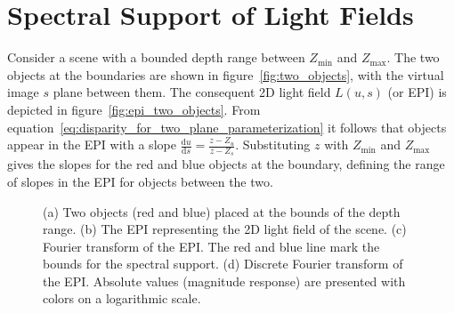 \section{Spectral Support of Light Fields}
\label{sec:Spectral_Support_for_Light_Field}

Consider a scene with a bounded depth range between $Z_{\text{min}}$ and $Z_{\text{max}}$.
The two objects at the boundaries are shown in figure~\ref{fig:two_objects}, with the virtual image $s$ plane between them.
The consequent 2D light field $L(u, s)$ (or EPI) is depicted in figure~\ref{fig:epi_two_objects}.
From equation~\ref{eq:disparity_for_two_plane_parameterization} it follows that objects appear in the EPI with a slope $\frac{\textrm{d}u}{\textrm{d}s} = \frac{z - Z_u}{z - Z_s}$.
Substituting $z$ with $Z_\text{min}$ and $Z_\text{max}$ gives the slopes for the red and blue objects at the boundary, defining the range of slopes in the EPI for objects between the two.

\begin{figure}[tb]
	\begin{subfigure}{0.5\textwidth}
		\centering
		
		\caption{}
		\label{fig:two_objects}
		\vspace{0.5cm}
		
		\caption{}
		\label{fig:epi_fourier_transform_1}
	\end{subfigure}
	\begin{subfigure}{0.5\textwidth}
		\centering
		
		\caption{}
		\label{fig:epi_two_objects}
		\vspace{0.5cm}
		
		\caption{}
		\label{fig:epi_fourier_transform_2}
	\end{subfigure}
	\caption[Spectral analysis for light fields with bounded depth range]
			{(a) Two objects (red and blue) placed at the bounds of the depth range. 
			 (b) The EPI representing the 2D light field of the scene.
			 (c) Fourier transform of the EPI. 
				 The red and blue line mark the bounds for the spectral support.
			 (d) Discrete Fourier transform of the EPI. 
				 Absolute values (magnitude response) are presented with colors on a logarithmic scale.}
	\label{fig:spectral_analysis_for_light_field}
\end{figure}

